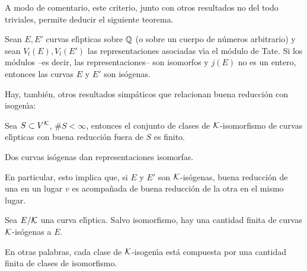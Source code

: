A modo de comentario, este criterio, junto con otros resultados no del todo
triviales, permite deducir el siguiente teorema.

\begin{teoIsogenia}\label{thm:isogenia}
	Sean $E,E'$ curvas el\'{\i}pticas sobre $\bb Q$ (o sobre un cuerpo de
	n\'{u}meros arbitrario) y sean $V_l(E),V_l(E')$ las representaciones
	asociadas v\'{\i}a el m\'{o}dulo de Tate. Si los m\'{o}dulos --es
	decir, las representaciones-- son isomorfos y $j(E)$ no es un entero,
	entonces las curvas $E$ y $E'$ son is\'{o}genas.
\end{teoIsogenia}

Hay, tambi\'{e}n, otros resultados simp\'{a}ticos que relacionan buena
reducci\'{o}n con isogen\'{\i}a:

\begin{teoBuenaRedFueraDeS}[Shafarevich]\label{thm:buenaredfuerades}
	Sea $S\subset\lugares{\cal K}$, $\#S<\infty$, entonces el conjunto de
	clases de $\cal K$-isomorfismo de curvas el\'{\i}pticas con buena
	reducci\'{o}n fuera de $S$ es finito.
\end{teoBuenaRedFueraDeS}

\begin{teoIsogeniaImplicaIsomorfismo}\label{thm:isogeniaimplicaisomorfismo}
	Dos curvas is\'{o}genas dan representaciones isomorfas.
\end{teoIsogeniaImplicaIsomorfismo}

En particular, esto implica que, si $E$ y $E'$ son $\cal K$-is\'{o}genas, buena
reducci\'{o}n de una en un lugar $v$ es acompa\~{n}ada de buena reducci\'{o}n
de la otra en el mismo lugar.

\begin{teoFinitasIsogenas}\label{thm:finitasisogenas}
	Sea $E/\cal K$ una curva el\'{\i}ptica. Salvo isomorfismo, hay una
	cantidad finita de curvas $\cal K$-is\'{o}genas a $E$.
\end{teoFinitasIsogenas}

En otras palabras, cada clase de $\cal K$-isogen\'{\i}a est\'{a} compuesta por
una cantidad finita de clases de isomorfismo.
